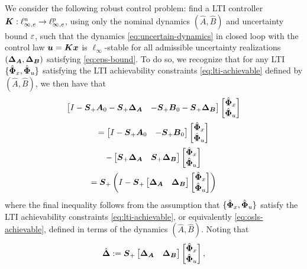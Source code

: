We consider the following robust control problem: find a LTI controller $\tf K : \ell^n_{\infty,e} \to \ell^p_{\infty,e}$, using only the nominal dynamics $(\hat A,\hat B)$ and uncertainty bound $\eps$, such that the dynamics \eqref{eq:uncertain-dynamics} in closed loop with the control law $\uu = \K \x$ is $\ell_\infty$-stable for all admissible uncertainty realizations $(\DA,\DB)$ satisfying \eqref{eq:eps-bound}.  To do so, we recognize that for any LTI $\{\Phixh,\Phiuh\}$ satisfying the LTI achievability constraints \eqref{eq:lti-achievable} defined by $(\hat A, \hat B)$, we then have that
\begin{multline}
\begin{bmatrix} I - \Sp\A_0 - \Sp\DA & - \Sp\B_0 - \Sp\DB \end{bmatrix}\begin{bmatrix} \Phixh \\ \Phiuh \end{bmatrix} \\= \begin{bmatrix} I - \Sp\A_0 & - \Sp\B_0 \end{bmatrix}\begin{bmatrix} \Phixh \\ \Phiuh \end{bmatrix}\\ - \begin{bmatrix} \Sp\DA & \Sp\DB \end{bmatrix}\begin{bmatrix} \Phixh \\ \Phiuh \end{bmatrix}\\ = \Sp\left(I - \Sp\begin{bmatrix} \DA & \DB \end{bmatrix}\begin{bmatrix} \Phixh \\ \Phiuh \end{bmatrix} \right)
\end{multline}
where the final inequality follows from the assumption that $\{\Phixh,\Phiuh\}$ satisfy the LTI achievability constraints \eqref{eq:lti-achievable}, or equivalently \eqref{eq:osls-achievable}, defined in terms of the dynamics $(\hat A, \hat B)$.  Noting that
\begin{equation}
\Dh := \Sp\begin{bmatrix} \DA & \DB \end{bmatrix}\begin{bmatrix} \Phixh \\ \Phiuh \end{bmatrix},
\end{equation}
